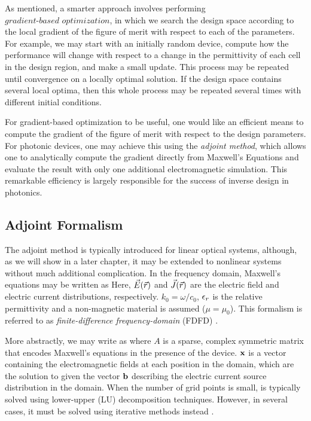 As mentioned, a smarter approach involves performing $\textit{gradient-based optimization}$, in which we search the design space according to the local gradient of the figure of merit with respect to each of the parameters.
For example, we may start with an initially random device, compute how the performance will change with respect to a change in the permittivity of each cell in the design region, and make a small update.
This process may be repeated until convergence on a locally optimal solution.
If the design space contains several local optima, then this whole process may be repeated several times with different initial conditions.

For gradient-based optimization to be useful, one would like an efficient means to compute the gradient of the figure of merit with respect to the design parameters.
For photonic devices, one may achieve this using the \textit{adjoint method}, which allows one to analytically compute the gradient directly from Maxwell's Equations and evaluate the result with only one additional electromagnetic simulation.
This remarkable efficiency is largely responsible for the success of inverse design in photonics.

\subsection{Adjoint Formalism}

The adjoint method is typically introduced for linear optical systems, although, as we will show in a later chapter, it may be extended to nonlinear systems without much additional complication.
In the frequency domain, Maxwell's equations may be written as
%
%
Here, $\vec{E}(\vec{r})$ and $\vec{J}(\vec{r})$ are the electric field and electric current distributions, respectively. $k_0 = \omega/c_0$, $\epsilon_r$ is the relative permittivity and a non-magnetic material is assumed ($\mu = \mu_0$).
This formalism is referred to as \textit{finite-difference frequency-domain} (FDFD) \cite{shin2012choice, taflove2000computational}.

More abstractly, we may write  as
%
%
where $A$ is a sparse, complex symmetric matrix that encodes Maxwell's equations in the presence of the device.
$\mathbf{x}$ is a vector containing the electromagnetic fields at each position in the domain, which are the solution to  given the vector $\mathbf{b}$ describing the electric current source distribution in the domain.
When the number of grid points is small,  is typically solved using lower-upper (LU) decomposition techniques.
However, in several cases, it must be solved using iterative methods instead \cite{shin2012choice}.

